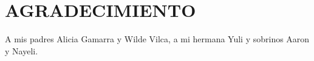 \chapter*{\flushright AGRADECIMIENTO}
\doublespacing
\begin{flushright}
       A mis padres Alicia Gamarra y Wilde Vilca, a mi hermana Yuli y sobrinos Aaron y Nayeli.
\end{flushright}
